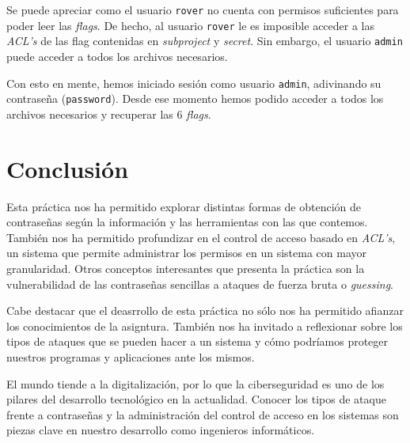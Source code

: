 \documentclass[]{article}
\begin{document}
\vspace{0.5cm}

Se puede apreciar como el usuario \texttt{rover} no cuenta con permisos suficientes para poder leer las \textit{flags}. De hecho, al usuario \texttt{rover} le es imposible acceder a las \textit{ACL's} de las flag contenidas en \textit{subproject} y \textit{secret}. Sin embargo, el usuario \texttt{admin} puede acceder a todos los archivos necesarios.

Con esto en mente, hemos iniciado sesión como usuario \texttt{admin}, adivinando su contraseña (\texttt{password}). Desde ese momento hemos podido acceder a todos los archivos necesarios y recuperar las 6 \textit{flags}.

\section{Conclusión}
\label{sec:conclusion}

Esta práctica nos ha permitido explorar distintas formas de obtención de contraseñas según la información y las herramientas con las que contemos. También nos ha permitido profundizar en el control de acceso basado en \textit{ACL's}, un sistema que permite administrar los permisos en un sistema con mayor granularidad. Otros conceptos interesantes que presenta la práctica son la vulnerabilidad de las contraseñas sencillas a ataques de fuerza bruta o \textit{guessing}.

Cabe destacar que el deasrrollo de esta práctica no sólo nos ha permitido afianzar los conocimientos de la asigntura. También nos ha invitado a reflexionar sobre los tipos de ataques que se pueden hacer a un sistema y cómo podríamos proteger nuestros programas y aplicaciones ante los mismos.

El mundo tiende a la digitalización, por lo que la ciberseguridad es uno de los pilares del desarrollo tecnológico en la actualidad. Conocer los tipos de ataque frente a contraseñas y la administración del control de acceso en los sistemas son piezas clave en nuestro desarrollo como ingenieros informáticos.
\end{document}
